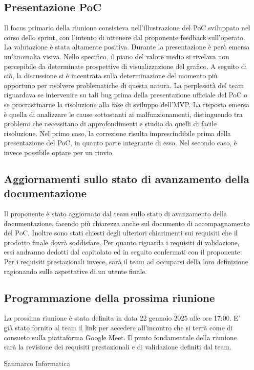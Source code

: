 \subsection{Presentazione PoC}
Il focus primario della riunione consisteva nell’illustrazione del PoC sviluppato nel corso dello sprint, con l’intento di ottenere dal proponente feedback sull’operato. 
La valutazione è stata altamente positiva. Durante la presentazione è però emersa un’anomalia visiva. Nello specifico, il piano del valore medio si rivelava non percepibile da determinate prospettive di visualizzazione del grafico.
A seguito di ciò, la discussione si è incentrata sulla determinazione del momento più opportuno per risolvere problematiche di questa natura. La perplessità del team riguardava se intervenire su tali bug prima della presentazione ufficiale del PoC o se procrastinarne la risoluzione alla fase di sviluppo dell’MVP. 
La risposta emersa è quella di analizzare le cause sottostanti ai malfunzionamenti, distinguendo tra problemi che necessitano di approfondimenti e studio da quelli di facile risoluzione. Nel primo caso, la correzione risulta imprescindibile prima della presentazione del PoC, in quanto parte integrante di esso. Nel secondo caso, è invece possibile optare per un rinvio.
\subsection{Aggiornamenti sullo stato di avanzamento della documentazione}
Il proponente è stato aggiornato dal team sullo stato di avanzamento della documentazione, facendo più chiarezza anche sul documento di accompagnamento del PoC.
Inoltre sono stati chiesti degli ulteriori chiarimenti sui requisiti che il prodotto finale dovrà soddisfare.
Per quanto riguarda i requisiti di validazione, essi andranno dedotti dal capitolato ed in seguito confermati con il proponente.
Per i requisiti prestazionali invece, sarà il team ad occuparsi della loro definizione ragionando sulle aspettative di un utente finale.
\subsection{Programmazione della prossima riunione}
La prossima riunione è stata definita in data 22 gennaio 2025 alle ore 17:00. E' già stato fornito al team il link per accedere all'incontro che si terrà come di consueto
sulla piattaforma Google Meet. Il punto fondamentale della riunione sarà la revisione dei requisiti prestazionali e di validazione definiti dal team.


\hfill\signature{Approvazione esterna}{Sanmarco Informatica}
